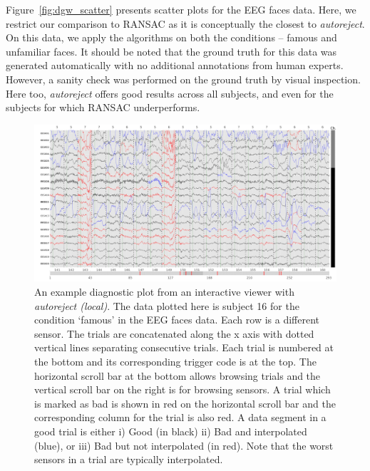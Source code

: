 Figure~\ref{fig:dgw_scatter} presents scatter plots for the EEG faces data.
%
Here, we restrict our comparison to RANSAC as it is conceptually the closest to \emph{autoreject}. On this data, we apply the algorithms on both the conditions -- famous and unfamiliar faces. It should be noted that the ground truth for this data was generated automatically with no additional annotations from human experts. However, a sanity check was performed on the ground truth by visual inspection. Here too, \emph{autoreject} offers good results across all subjects, and even for the subjects for which RANSAC underperforms.

\clearpage
\begin{figure}
	\centering
	\includegraphics[width=\textwidth]{figures/figure8.pdf}
    \caption[An example diagnostic plot from an interactive viewer with \emph{autoreject (local)}]{An example diagnostic plot from an interactive viewer with \emph{autoreject (local)}. The data plotted here is subject 16 for the condition `famous' in the EEG faces data. Each row is a different sensor. The trials are concatenated along the x axis with dotted vertical lines separating consecutive trials. Each trial is numbered at the bottom and its corresponding trigger code is at the top. The horizontal scroll bar at the bottom allows browsing trials and the vertical scroll bar on the right is for browsing sensors. A trial which is marked as bad is shown in red on the horizontal scroll bar and the corresponding column for the trial is also red. A data segment in a good trial is either i) Good (in black) ii) Bad and interpolated (blue), or iii) Bad but not interpolated (in red). Note that the worst sensors in a trial are typically interpolated.}
    \label{fig:diagnostic_plot}
\end{figure}
\clearpage

%
%
%

%
%
%
%
%

%
%

%

%
%
%
%
%
%
%
%
%

%
%
%
%

%
%
%
%

%

%

%
%
%
%
%
%
%

%

%
%

%
%
%

%
